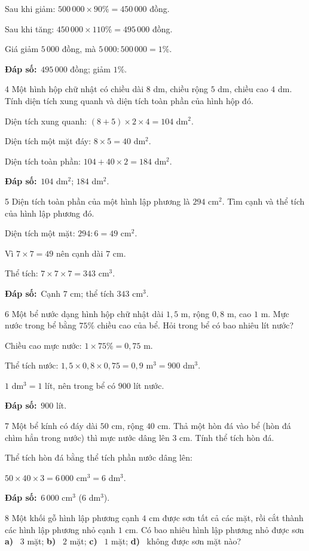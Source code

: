\documentclass[11pt]{article}
\newif\ifsol \solfalse
\providecommand{\AnsWord}{Đáp số}
\newcommand{\dapso}[1]{\par\textbf{\AnsWord:}\ #1}
\newcommand{\probsol}[1]{%
  \begin{lrbox}{\solmeasure}\begin{minipage}{\dimexpr\linewidth-24pt\relax}#1\end{minipage}\end{lrbox}%
  \ifsol
    \begin{solbox}#1\end{solbox}%
  \else
    \setlength{\solht}{\dimexpr\ht\solmeasure+\dp\solmeasure+0.85cm\relax}%
    \ifdim\solht<1.35cm\setlength{\solht}{1.35cm}\fi
    \begin{tcolorbox}[colback=white,colframe=Line,boxrule=0.8pt,arc=5pt,
      left=8pt,right=8pt,top=4pt,bottom=4pt,height=\solht]{\footnotesize\color{Slate}\itshape\WorkWord}\end{tcolorbox}%
  \fi}
\newcommand{\pa}[1]{\textbf{#1)}\ }
\newcommand{\gap}{\vspace{0.3cm}}
\def\WorkWord{Bài làm:}
\def\AnsWord{Đáp số}
\begin{document}
\probsol{
Sau khi giảm: $500\,000\times90\%=450\,000$ đồng.\par
Sau khi tăng: $450\,000\times110\%=495\,000$ đồng.\par
Giá giảm $5\,000$ đồng, mà $5\,000:500\,000=1\%$.
\dapso{$495\,000$ đồng; giảm $1\%$.}}
\gap
\begin{probbox}{4}{\relax}
Một hình hộp chữ nhật có chiều dài $8$ dm, chiều rộng $5$ dm, chiều cao $4$ dm. Tính diện tích xung quanh và diện tích toàn phần của hình hộp đó.
\end{probbox}
\probsol{
Diện tích xung quanh: $(8+5)\times2\times4=104$ dm$^2$.\par
Diện tích một mặt đáy: $8\times5=40$ dm$^2$.\par
Diện tích toàn phần: $104+40\times2=184$ dm$^2$.
\dapso{$104$ dm$^2$; $184$ dm$^2$.}}
\gap
\begin{probbox}{5}{\relax}
Diện tích toàn phần của một hình lập phương là $294$ cm$^2$. Tìm cạnh và thể tích của hình lập phương đó.
\end{probbox}
\probsol{
Diện tích một mặt: $294:6=49$ cm$^2$.\par
Vì $7\times7=49$ nên cạnh dài $7$ cm.\par
Thể tích: $7\times7\times7=343$ cm$^3$.
\dapso{Cạnh $7$ cm; thể tích $343$ cm$^3$.}}
\gap
\begin{probbox}{6}{\relax}
Một bể nước dạng hình hộp chữ nhật dài $1{,}5$ m, rộng $0{,}8$ m, cao $1$ m. Mực nước trong bể bằng $75\%$ chiều cao của bể. Hỏi trong bể có bao nhiêu lít nước?
\end{probbox}
\probsol{
Chiều cao mực nước: $1\times75\%=0{,}75$ m.\par
Thể tích nước: $1{,}5\times0{,}8\times0{,}75=0{,}9$ m$^3=900$ dm$^3$.\par
$1$ dm$^3=1$ lít, nên trong bể có $900$ lít nước.
\dapso{$900$ lít.}}
\gap
\begin{probbox}{7}{\relax}
Một bể kính có đáy dài $50$ cm, rộng $40$ cm. Thả một hòn đá vào bể (hòn đá chìm hẳn trong nước) thì mực nước dâng lên $3$ cm. Tính thể tích hòn đá.
\end{probbox}
\probsol{
Thể tích hòn đá bằng thể tích phần nước dâng lên:\par
$50\times40\times3=6\,000$ cm$^3=6$ dm$^3$.
\dapso{$6\,000$ cm$^3$ ($6$ dm$^3$).}}
\gap
\begin{probbox}{8}{\relax}
Một khối gỗ hình lập phương cạnh $4$ cm được sơn tất cả các mặt, rồi cắt thành các hình lập phương nhỏ cạnh $1$ cm. Có bao nhiêu hình lập phương nhỏ được sơn \pa{a} $3$ mặt; \pa{b} $2$ mặt; \pa{c} $1$ mặt; \pa{d} không được sơn mặt nào?
\end{probbox}
\end{document}
